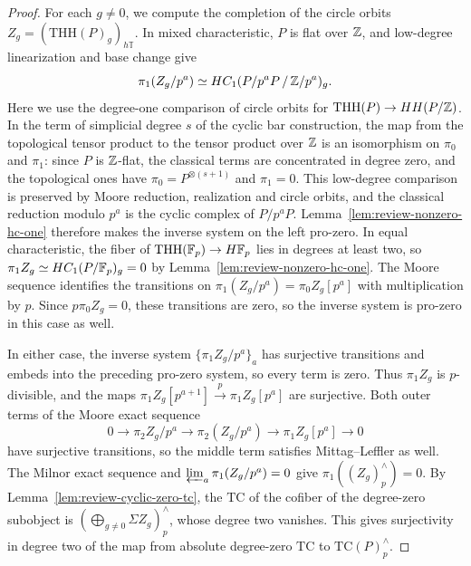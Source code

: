 \begin{proof}
For each $g\ne0$, we compute the completion of the circle orbits $Z_g=(\mathrm{THH}(P)_g)_{h\mathbb T}$.
In mixed characteristic, $P$ is flat over $\mathbb Z$, and low-degree linearization and base change give
\[
 \pi_1(Z_g/p^a)\simeq
 HC_1(P/p^aP\,/\,\mathbb Z/p^a)_g.
\]
Here we use the degree-one comparison of circle orbits for $\mathrm{THH}(P)\to HH(P/\mathbb Z)$.
In the term of simplicial degree $s$ of the cyclic bar construction, the map from the topological tensor product to the tensor product over $\mathbb Z$ is an isomorphism on $\pi_0$ and $\pi_1$: since $P$ is $\mathbb Z$-flat, the classical terms are concentrated in degree zero, and the topological ones have $\pi_0=P^{\otimes(s+1)}$ and $\pi_1=0$.
This low-degree comparison is preserved by Moore reduction, realization and circle orbits, and the classical reduction modulo $p^a$ is the cyclic complex of $P/p^aP$.
Lemma~\ref{lem:review-nonzero-hc-one} therefore makes the inverse system on the left pro-zero.
In equal characteristic, the fiber of $\mathrm{THH}(\mathbb F_p)\to H\mathbb F_p$ lies in degrees at least two, so $\pi_1Z_g\simeq HC_1(P/\mathbb F_p)_g=0$ by Lemma~\ref{lem:review-nonzero-hc-one}.
The Moore sequence identifies the transitions on $\pi_1(Z_g/p^a)=\pi_0Z_g[p^a]$ with multiplication by $p$.
Since $p\pi_0Z_g=0$, these transitions are zero, so the inverse system is pro-zero in this case as well.

In either case, the inverse system $\{\pi_1Z_g/p^a\}_a$ has surjective transitions and embeds into the preceding pro-zero system, so every term is zero.
Thus $\pi_1Z_g$ is $p$-divisible, and the maps $\pi_1Z_g[p^{a+1}]\xrightarrow{p}\pi_1Z_g[p^a]$ are surjective.
Both outer terms of the Moore exact sequence
\[
 0\to\pi_2Z_g/p^a\to\pi_2(Z_g/p^a)\to \pi_1Z_g[p^a]\to0
\]
have surjective transitions, so the middle term satisfies Mittag--Leffler as well.
The Milnor exact sequence and $\varprojlim_a\pi_1(Z_g/p^a)=0$ give $\pi_1((Z_g)^\wedge_p)=0$.
By Lemma~\ref{lem:review-cyclic-zero-tc}, the $\mathrm{TC}$ of the cofiber of the degree-zero subobject is $(\bigoplus_{g\ne0}\Sigma Z_g)^\wedge_p$, whose degree two vanishes.
This gives surjectivity in degree two of the map from absolute degree-zero $\mathrm{TC}$ to $\mathrm{TC}(P)^\wedge_p$.
\end{proof}

